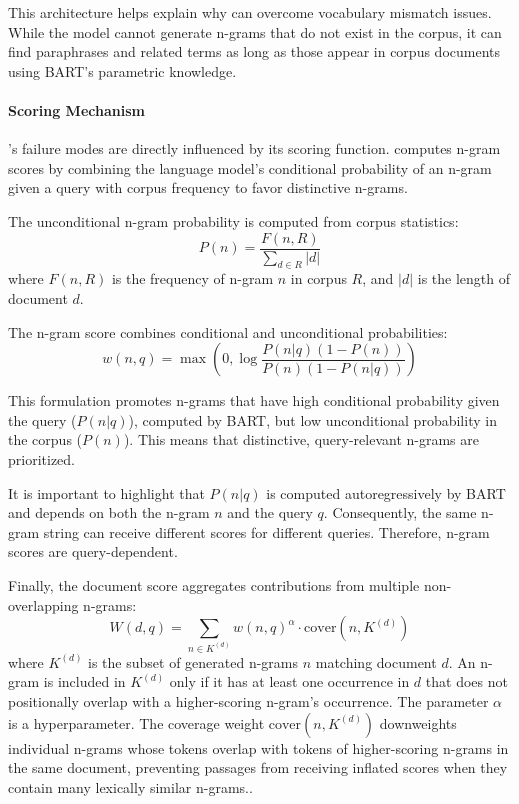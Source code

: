 This architecture helps explain why  can overcome vocabulary mismatch issues. While the model cannot generate n-grams that do not exist in the corpus, it can find paraphrases and related terms as long as those appear in corpus documents using BART's parametric knowledge.

\paragraph{Scoring Mechanism}
\label{par:scormech}
's failure modes are directly influenced by its scoring function.  computes n-gram scores by combining the language model's conditional probability of an n-gram given a query with corpus frequency to favor distinctive n-grams.

The unconditional n-gram probability is computed from corpus statistics:
\begin{equation}
    P(n) = \frac{F(n, R)}{\sum_{d \in R} |d|}
    \label{eq:unconditional-prob}
\end{equation}
where $F(n, R)$ is the frequency of n-gram $n$ in corpus $R$, and $|d|$ is the length of document $d$.

The n-gram score combines conditional and unconditional probabilities:
\begin{equation}
    w(n, q) = \max\left(0, \log \frac{P(n|q)(1 - P(n))}{P(n)(1 - P(n|q))}\right)
    \label{eq:ngram-score}
\end{equation}

This formulation promotes n-grams that have high conditional probability given the query ($P(n|q)$), computed by BART, but low unconditional probability in the corpus ($P(n)$). This means that distinctive, query-relevant n-grams are prioritized.

It is important to highlight that $P(n|q)$ is computed autoregressively by BART and depends on both the n-gram $n$ and the query $q$. Consequently, the same n-gram string can receive different scores for different queries. Therefore, n-gram scores are query-dependent.

Finally, the document score aggregates contributions from multiple non-overlapping n-grams:
\begin{equation}
    W(d, q) = \sum_{n \in K^{(d)}} w(n, q)^\alpha \cdot \text{cover}(n, K^{(d)})
    \label{eq:doc-score}
\end{equation}
where $K^{(d)}$ is the subset of generated n-grams $n$ matching document $d$. 
An n-gram is included in $K^{(d)}$ only if it has at least one occurrence 
in $d$ that does not positionally overlap with a higher-scoring n-gram's 
occurrence. The parameter $\alpha$ is a hyperparameter. The coverage weight $\text{cover}(n, K^{(d)})$ downweights individual n-grams whose tokens overlap with tokens of higher-scoring n-grams in the same document, preventing passages from receiving inflated scores when they contain many lexically similar n-grams.\cite{michele-bevilacqua-autoregressive-search}.

